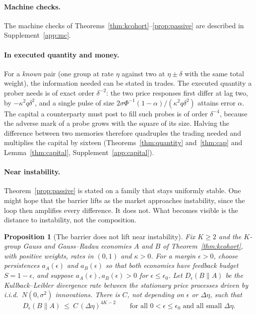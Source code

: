 \documentclass[12pt]{article}
\newtheorem{proposition}[theorem]{Proposition}
\theoremstyle{definition}
\theoremstyle{remark}
\begin{document}
\paragraph{Machine checks.} The machine checks of Theorems~\ref{thm:kcohort}--\ref{prop:passive} are described in Supplement~\ref{app:mc}.


\paragraph{In executed quantity and money.} For a \emph{known} pair (one group at rate $\eta$ against two at $\eta\pm\delta$ with the same total weight), the information needed can be stated in trades. The executed quantity a prober needs is of exact order $\delta^{-2}$: the two price responses first differ at lag two, by $-\kappa^2q\delta^2$, and a single pulse of size $2\sigma\Phi^{-1}(1-\alpha)/(\kappa^2q\delta^2)$ attains error $\alpha$. The capital a counterparty must post to fill such probes is of order $\delta^{-4}$, because the adverse mark of a probe grows with the square of its size. Halving the difference between two memories therefore quadruples the trading needed and multiplies the capital by sixteen (Theorems~\ref{thm:quantity} and~\ref{thm:cap} and Lemma~\ref{thm:capital}, Supplement~\ref{app:capital}).

\paragraph{Near instability.} Theorem~\ref{prop:passive} is stated on a family that stays uniformly stable. One might hope that the barrier lifts as the market approaches instability, since the loop then amplifies every difference. It does not. What becomes visible is the distance to instability, not the composition.

\begin{proposition}[The barrier does not lift near instability]\label{prop:nearcrit}
Fix $K\ge2$ and the $K$-group Gauss and Gauss--Radau economies $A$ and $B$ of Theorem~\ref{thm:kcohort}, with positive weights, rates in $(0,1)$ and $\kappa>0$. For a margin $\epsilon>0$, choose persistences $a_A(\epsilon)$ and $a_B(\epsilon)$ so that both economies have feedback budget $S=1-\epsilon$, and suppose $a_A(\epsilon),a_B(\epsilon)>0$ for $\epsilon\le\epsilon_0$. Let $D_\epsilon(B\|A)$ be the Kullback--Leibler divergence rate between the stationary price processes driven by i.i.d.\ $N(0,\sigma^2)$ innovations. There is $C$, not depending on $\epsilon$ or $\Delta\eta$, such that
\[
D_\epsilon(B\|A)\ \le\ C\,(\Delta\eta)^{4K-2}\qquad\text{for all }0<\epsilon\le\epsilon_0\text{ and all small }\Delta\eta .
\]
\end{proposition}
\end{document}
